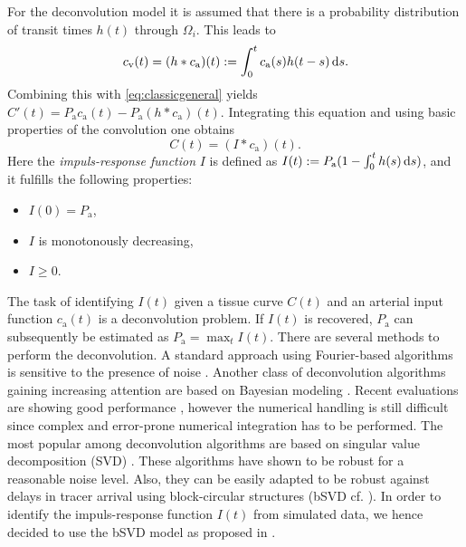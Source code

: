\documentclass[paper=a4, fontsize=11pt,parskip=half,headings=small]{scrartcl}
\newcommand{\ca}{c_\mathrm{a}}
\newcommand{\cout}{c_{\mathrm{v}}}
\newcommand{\Pa}{P_{\mathrm{a}}}
\begin{document}
	For the deconvolution model it is assumed that there is a probability distribution of transit times $h(t)$ through $\Omega_i$. 
	This leads to
	\begin{equation}
		\cout(t) = (h*\ca)(t) := \int_0^t \ca(s) h(t-s) \diffint s.
	\end{equation}
	Combining this with \eqref{eq:classicgeneral} yields $C'(t) = \Pa\ca(t)-\Pa (h*\ca)(t)$.
	Integrating this equation and using basic properties of the convolution one obtains
	\begin{equation}
		C(t) = (I*\ca)(t).
		\label{eq:conv}
	\end{equation}
	Here the \emph{impuls-response function} $I$ is defined as $I(t) := \Pa(1-\int_0^t h(s) \diffint s)$, and it fulfills the following properties:
	\begin{itemize}
		\item $I(0) = \Pa$,
		\item $I$ is monotonously decreasing,
		\item $I\ge 0$.		
	\end{itemize}
	The task of identifying $I(t)$ given a tissue curve $C(t)$ and an arterial input function $\ca(t)$ is a deconvolution problem.
	If $I(t)$ is recovered, $\Pa$ can subsequently be estimated as $\Pa = \max_{t} I(t)$.
	There are several methods to perform the deconvolution.
	A standard approach using Fourier-based algorithms is sensitive to the presence of noise \cite{ostergaard96,wirestam00}.
	Another class of deconvolution algorithms gaining increasing attention are based on Bayesian modeling \cite{boutelier12,mouridsen06}.
	Recent evaluations are showing good performance \cite{sasaki13}, however the numerical handling is still difficult since complex and error-prone numerical integration has to be performed.
	The most popular among deconvolution algorithms are based on singular value decomposition (SVD) \cite{ostergaard96}.
	These algorithms have shown to be robust for a reasonable noise level.
	Also, they can be easily adapted to be robust against delays in tracer arrival using block-circular structures (bSVD cf. \cite{wu03}).
	In order to identify the impuls-response function $I(t)$ from simulated data, we hence decided to use the bSVD model as proposed in \cite{wu03}.
\end{document}
